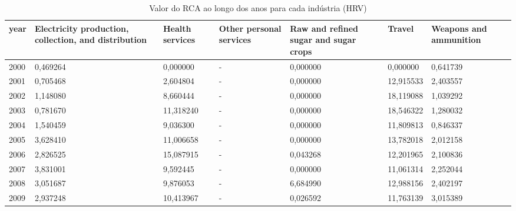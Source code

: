 \begin{table}
\centering
\caption{Valor do RCA ao longo dos anos para cada indústria (HRV)}
\begin{tabular}{p{1cm}p{2cm}p{2cm}p{2cm}p{2cm}p{2cm}p{2cm}}
\toprule
 year &  Electricity production, collection, and distribution &  Health services &  Other personal services &  Raw and refined sugar and sugar crops &    Travel &  Weapons and ammunition \\
\midrule
 2000 &                                           0,469264 &         0,000000 &                        - &                               0,000000 &  0,000000 &                0,641739 \\
 2001 &                                           0,705468 &         2,604804 &                        - &                               0,000000 & 12,915533 &                2,403557 \\
 2002 &                                           1,148080 &         8,660444 &                        - &                               0,000000 & 18,119088 &                1,039292 \\
 2003 &                                           0,781670 &        11,318240 &                        - &                               0,000000 & 18,546322 &                1,280032 \\
 2004 &                                           1,540459 &         9,036300 &                        - &                               0,000000 & 11,809813 &                0,846337 \\
 2005 &                                           3,628410 &        11,006658 &                        - &                               0,000000 & 13,782018 &                2,012158 \\
 2006 &                                           2,826525 &        15,087915 &                        - &                               0,043268 & 12,201965 &                2,100836 \\
 2007 &                                           3,831001 &         9,592445 &                        - &                               0,000000 & 11,061314 &                2,252044 \\
 2008 &                                           3,051687 &         9,876053 &                        - &                               6,684990 & 12,988156 &                2,402197 \\
 2009 &                                           2,937248 &        10,413967 &                        - &                               0,026592 & 11,763139 &                3,015389 \\

\end{tabular}
\end{table}
